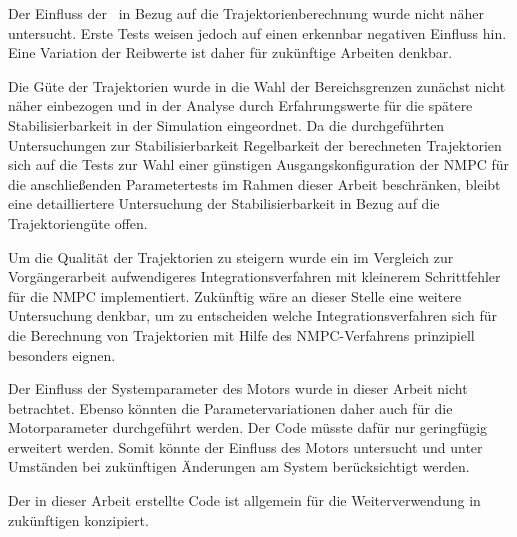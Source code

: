 Der Einfluss der \crb\ in Bezug auf die Trajektorienberechnung wurde nicht näher untersucht. Erste Tests weisen jedoch auf einen erkennbar negativen Einfluss hin. Eine Variation der Reibwerte ist daher für zukünftige Arbeiten denkbar.

Die Güte der Trajektorien wurde in die Wahl der Bereichsgrenzen zunächst nicht näher einbezogen und in der Analyse durch Erfahrungswerte für die spätere Stabilisierbarkeit in der Simulation eingeordnet. Da die durchgeführten Untersuchungen zur Stabilisierbarkeit \bzw Regelbarkeit der berechneten Trajektorien sich auf die Tests zur Wahl einer günstigen Ausgangskonfiguration der NMPC für die anschließenden Parametertests im Rahmen dieser Arbeit beschränken, bleibt eine detailliertere Untersuchung der Stabilisierbarkeit in Bezug auf die Trajektoriengüte offen.

Um die Qualität der Trajektorien zu steigern wurde ein im Vergleich zur Vorgängerarbeit aufwendigeres Integrationsverfahren mit kleinerem Schrittfehler für die NMPC implementiert. Zukünftig wäre an dieser Stelle eine weitere Untersuchung denkbar, um zu entscheiden welche Integrationsverfahren sich für die Berechnung von Trajektorien mit Hilfe des NMPC-Verfahrens prinzipiell besonders eignen. 

Der Einfluss der Systemparameter des Motors wurde in dieser Arbeit nicht betrachtet.
Ebenso könnten die Parametervariationen daher auch für die Motorparameter durchgeführt werden.
Der Code müsste dafür nur geringfügig erweitert werden.
Somit könnte der Einfluss des Motors untersucht und unter Umständen bei zukünftigen Änderungen am System berücksichtigt werden.

Der in dieser Arbeit erstellte Code ist allgemein für die Weiterverwendung in zukünftigen konzipiert.